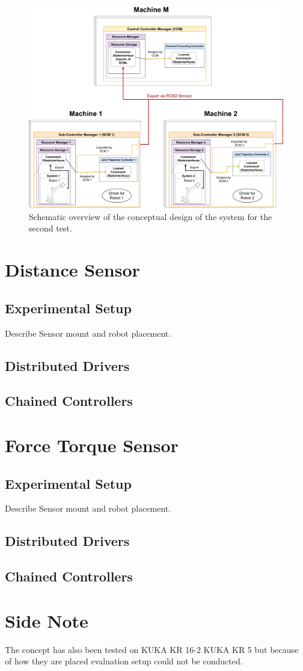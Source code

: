 \begin{figure}[htbp]
	\centering
	\includegraphics[width=1\textwidth]{Figures/c6/test_scenario_2.pdf}
	\caption{Schematic overview of the conceptual design of the system for the second test.}
	\label{c6_fig_test_scenario_2}
\end{figure}
\section{Distance Sensor}
\subsection{Experimental Setup}
Describe Sensor mount and robot placement.
\subsection{Distributed Drivers}
\subsection{Chained Controllers}
\section{Force Torque Sensor}
\subsection{Experimental Setup}
Describe Sensor mount and robot placement.
\subsection{Distributed Drivers}
\subsection{Chained Controllers}
\section*{Side Note}
The concept has also been tested on KUKA KR 16-2 KUKA KR 5 but because of how they are placed evaluation setup could not be conducted.

